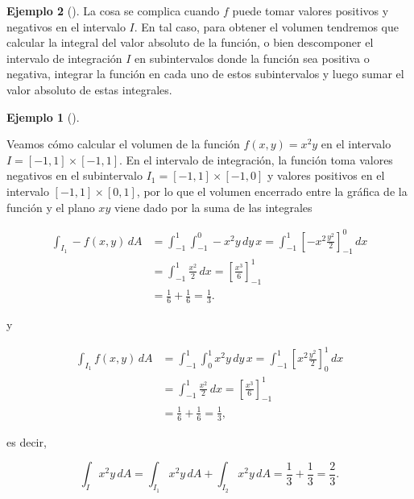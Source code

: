 \documentclass[
  a4paper,
]{scrreport}
\theoremstyle{definition}
\newtheorem{example}{Ejemplo}[chapter]
\theoremstyle{plain}
\theoremstyle{definition}
\theoremstyle{definition}
\theoremstyle{plain}
\theoremstyle{plain}
\theoremstyle{remark}
\begin{document}
\begin{example}[]
La cosa se complica cuando \(f\) puede tomar valores positivos y
negativos en el intervalo \(I\). En tal caso, para obtener el volumen
tendremos que calcular la integral del valor absoluto de la función, o
bien descomponer el intervalo de integración \(I\) en subintervalos
donde la función sea positiva o negativa, integrar la función en cada
uno de estos subintervalos y luego sumar el valor absoluto de estas
integrales.

\begin{example}[]\protect\hypertarget{exm-volumen-integral-doble}{}\label{exm-volumen-integral-doble}

Veamos cómo calcular el volumen de la función \(f(x,y)=x^2y\) en el
intervalo \(I=[-1,1]\times[-1,1]\). En el intervalo de integración, la
función toma valores negativos en el subintervalo
\(I_1=[-1,1]\times[-1,0]\) y valores positivos en el intervalo
\([-1,1]\times[0,1]\), por lo que el volumen encerrado entre la gráfica
de la función y el plano \(xy\) viene dado por la suma de las integrales

\begin{align*}
\int_{I_1} -f(x,y)\,dA 
&= \int_{-1}^1\int_{-1}^0 -x^2y\,dy\,x
= \int_{-1}^1 \left[-x^2\frac{y^2}{2}\right]_{-1}^0\,dx \\
&= \int_{-1}^1 \frac{x^2}{2}\,dx
= \left[\frac{x^3}{6}\right]_{-1}^1 \\
&= \frac{1}{6}+\frac{1}{6} 
= \frac{1}{3}.
\end{align*}

y

\begin{align*}
\int_{I_1} f(x,y)\,dA 
&= \int_{-1}^1\int_0^1 x^2y\,dy\,x
= \int_{-1}^1 \left[x^2\frac{y^2}{2}\right]_0^1\,dx \\
&= \int_{-1}^1 \frac{x^2}{2}\,dx
= \left[\frac{x^3}{6}\right]_{-1}^1 \\
&= \frac{1}{6}+\frac{1}{6} 
= \frac{1}{3},
\end{align*}

es decir,

\[
\int_I x^2y\,dA 
= \int_{I_1} x^2y\,dA + \int_{I_2} x^2y\,dA
= \frac{1}{3} + \frac{1}{3}
= \frac{2}{3}.
\]

\end{example}

\begin{tcolorbox}[enhanced jigsaw, leftrule=.75mm, colbacktitle=quarto-callout-tip-color!10!white, toprule=.15mm, opacityback=0, opacitybacktitle=0.6, toptitle=1mm, breakable, bottomtitle=1mm, colframe=quarto-callout-tip-color-frame, rightrule=.15mm, titlerule=0mm, title=\textcolor{quarto-callout-tip-color}{\faLightbulb}\hspace{0.5em}{Tip}, arc=.35mm, left=2mm, bottomrule=.15mm, colback=white, coltitle=black]


\end{tcolorbox}
\end{example}
\end{document}
